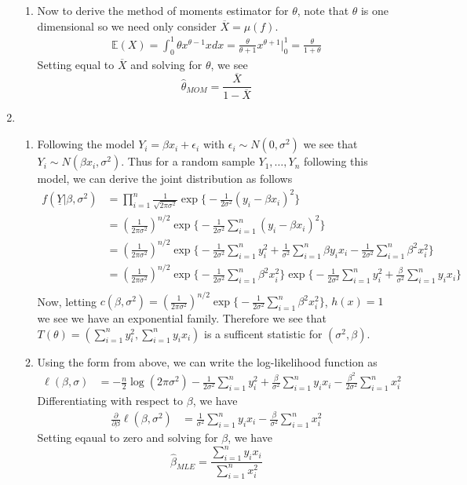 \documentclass[12pt]{article}  %
\newcommand{\e}{{\epsilon}}
\newcommand{\E}{{\mathbb{E}}}
\begin{document}
\begin{enumerate}
\begin{enumerate}
\item Now to derive the method of moments estimator for $\theta$, note that $\theta$ is one dimensional so we need only consider $\overline{X} = \mu(f)$. 
\begin{align*}
\E(X) = \int_{0}^1 \theta x^{\theta -1}xdx = \frac{\theta}{\theta+1}x^{\theta + 1}\Big\vert_{0}^1 = \frac{\theta}{1+\theta}
\end{align*}
Setting equal to $\overline{X}$ and solving for $\theta$, we see $$\hat{\theta}_{MOM} = \frac{\overline{X}}{1-\overline{X}}$$
\end{enumerate}

\item 
\begin{enumerate}
\item Following the model $Y_i = \beta x_i + \e_i$ with $\e_i \sim N(0,\sigma^2)$ we see that $Y_i\sim N(\beta x_i, \sigma^2)$. Thus for a random sample $Y_1, \ldots, Y_n$ following this model, we can derive the joint distribution as follows 
\begin{align*}
f(\underline{Y}|\beta, \sigma^2) &= \prod_{i=1}^{n}\frac{1}{\sqrt{2\pi\sigma^2}}\exp\Big\{-\frac{1}{2\sigma^2}(y_i - \beta x_i)^2\Big\}\\
&= \left(\frac{1}{2\pi\sigma^2}\right)^{n/2}\exp\Big\{-\frac{1}{2\sigma^2}\sum_{i=1}^{n}(y_i - \beta x_i)^2\Big\}\\
&= \left(\frac{1}{2\pi\sigma^2}\right)^{n/2}\exp\Big\{-\frac{1}{2\sigma^2}\sum_{i=1}^{n}y_i^2 +\frac{1}{\sigma^2}\sum_{i=1}^{n}\beta y_ix_i - \frac{1}{2\sigma^2}\sum_{i=1}^{n}\beta^2x_i^2\Big\}\\
&= \left(\frac{1}{2\pi\sigma^2}\right)^{n/2}\exp\Big\{ - \frac{1}{2\sigma^2}\sum_{i=1}^{n}\beta^2x_i^2\Big\}\exp\Big\{-\frac{1}{2\sigma^2}\sum_{i=1}^{n}y_i^2 +\frac{\beta}{\sigma^2}\sum_{i=1}^{n} y_ix_i\Big\}\\
\end{align*}
Now, letting $c(\beta, \sigma^2) = \left(\frac{1}{2\pi\sigma^2}\right)^{n/2}\exp\Big\{ - \frac{1}{2\sigma^2}\sum_{i=1}^{n}\beta^2x_i^2\Big\}$, $h(x) =1$ we see we have an exponential family. Therefore we see that $T(\theta) = (\sum_{i=1}^ny_i^2, \sum_{i=1}^{n}y_ix_i)$ is a sufficent statistic for $(\sigma^2, \beta)$. 

\item Using the form from above, we can write the log-likelihood function as 
\begin{align*}
\ell(\beta,\sigma) &= -\frac{n}{2}\log(2\pi\sigma^2) -\frac{1}{2\sigma^2}\sum_{i=1}^{n}y_i^2 +\frac{\beta}{\sigma^2}\sum_{i=1}^{n} y_ix_i - \frac{\beta^2}{2\sigma^2}\sum_{i=1}^{n}x_i^2
\end{align*}
Differentiating with respect to $\beta$, we have 
\begin{align*}
\frac{\partial}{\partial\beta}\ell(\beta, \sigma^2) &= \frac{1}{\sigma^2}\sum_{i=1}^ny_ix_i - \frac{\beta}{\sigma^2}\sum_{i=1}^{n}x_i^2
\end{align*}
Setting eqaual to zero and solving for $\beta$, we have $$\hat{\beta}_{MLE} = \frac{\sum_{i=1}^ny_ix_i}{\sum_{i=1}^nx_i^2}$$


\end{enumerate}
\end{enumerate}
\end{document}
